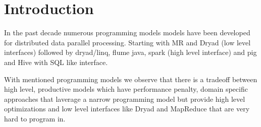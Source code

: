\section{Introduction}
\label{sec:introduction}

In the past decade numerous programming models models have been developed for distributed data parallel processing. Starting with MR and Dryad (low level interfaces) followed by dryad/linq, flume java, spark (high level interface) and pig and Hive with SQL like interface.

With mentioned programming models we observe that there is a tradeoff between high level, productive models which have performance penalty, domain specific approaches that laverage a narrow programming model but provide high level optimizations and low level interfaces like Dryad and MapReduce that are very hard to program in.






\begin{itemize}
\end{itemize} 

